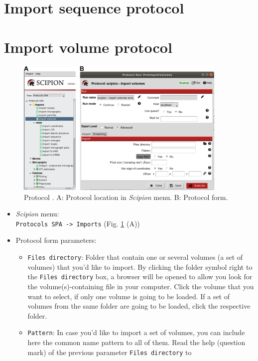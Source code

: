 \documentclass[12pt, draft]{article} %
\def\scipion{\textit{Scipion}\xspace}
\newcommand{\ffigure}[1]{{Fig. {\ref{#1}}}\xspace}
\newcommand{\scommand}[1]{{{\keys{#1}}}\xspace}
\newcommand{\ttt}[1]{\texttt{#1}}
\begin{document}
\begin{appendices}
\section{Import sequence protocol}
\label{app:importSequence}

\section{Import volume protocol}
\label{app:importVolume}

\begin{figure}[H]
    \centering 
    \captionsetup{width=.7\linewidth} 
    \includegraphics[width=0.90\textwidth]{Images_appendix/Fig100.png}
    \caption{Protocol \scommand{import volumes}. A: Protocol location in \scipion menu. B: Protocol form.}
    \label{fig:app_protocol_volume_1}
   \end{figure}
   
 \begin{itemize}
  \item \scipion menu:\\
  \ttt{Protocols SPA -> Imports} (\ffigure{fig:app_protocol_volume_1} (A))\\
  
  \item Protocol form parameters:\\
  \begin{itemize}
   \item \ttt{Files directory}: Folder that contain one or several volumes (a set of volumes) that you'd like to import. By clicking the folder symbol right to the \ttt{Files directory} box, a browser will be opened to allow you look for the volume(s)-containing file in your computer. Click the volume that you want to select, if only one volume is going to be loaded. If a set of volumes from the same folder are going to be loaded, click the respective folder.\\
   \item \ttt{Pattern}: In case you'd like to import a set of volumes, you can include here the common name pattern to all of them. Read the help (question mark) of the previous parameter \ttt{Files directory} to 
   

\end{itemize}
\end{itemize}
\end{appendices}
\end{document}
